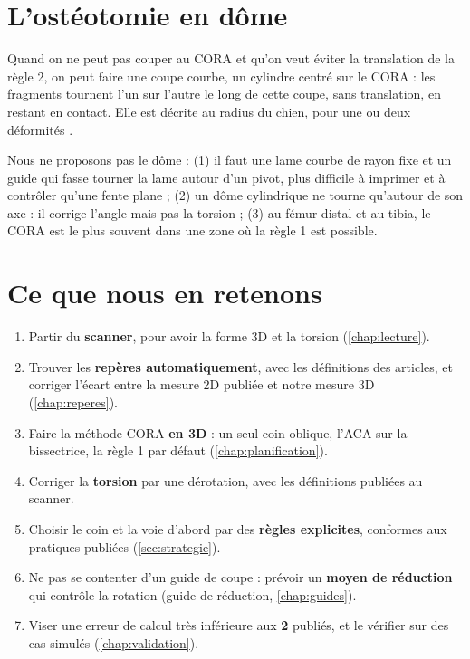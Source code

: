 \section{L'ostéotomie en dôme}
\label{sec:dome}

Quand on ne peut pas couper au CORA et qu'on veut éviter la translation de la règle 2, on peut faire une coupe
courbe, un cylindre centré sur le CORA : les fragments tournent l'un sur l'autre le long de cette coupe, sans
translation, en restant en contact. Elle est décrite au radius du chien, pour une ou deux déformités
\cite{fox2006}.

\begin{pourquoi}
Nous ne proposons pas le dôme : (1) il faut une lame courbe de rayon fixe et un guide qui fasse tourner la lame autour
d'un pivot, plus difficile à imprimer et à contrôler qu'une fente plane ; (2) un dôme cylindrique ne tourne qu'autour
de son axe : il corrige l'angle mais pas la torsion ; (3) au fémur distal et au tibia, le CORA est le plus souvent dans
une zone où la règle 1 est possible.
\end{pourquoi}

\section{Ce que nous en retenons}
\label{sec:retenu}

\begin{aretenir}[title={Les décisions du projet, tirées de l'état de l'art}]
\begin{enumerate}
  \item Partir du \textbf{scanner}, pour avoir la forme 3D et la torsion (\cref{chap:lecture}).
  \item Trouver les \textbf{repères automatiquement}, avec les définitions des articles, et corriger l'écart entre
  la mesure 2D publiée et notre mesure 3D (\cref{chap:reperes}).
  \item Faire la méthode CORA \textbf{en 3D} : un seul coin oblique, l'ACA sur la bissectrice, la règle 1 par défaut
  (\cref{chap:planification}).
  \item Corriger la \textbf{torsion} par une dérotation, avec les définitions publiées au scanner.
  \item Choisir le coin et la voie d'abord par des \textbf{règles explicites}, conformes aux pratiques publiées
  (\cref{sec:strategie}).
  \item Ne pas se contenter d'un guide de coupe : prévoir un \textbf{moyen de réduction} qui contrôle la rotation
  (guide de réduction, \cref{chap:guides}).
  \item Viser une erreur de calcul très inférieure aux \textbf{2\degre} publiés, et le vérifier sur des cas simulés
  (\cref{chap:validation}).
\end{enumerate}
\end{aretenir}
